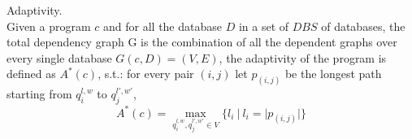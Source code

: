 \documentclass[a4paper,11pt]{article}
\begin{document}
%
%
\begin{defn}
Adaptivity.
\\
Given a program $c$ and for all the database $D$ in a set of $DBS$ of databases, the total dependency graph G is the combination of all the dependent graphs over every single database $G(c, D) = (V, E)$, the adaptivity of the program is defined as $A^*(c)$, s.t.:
for every pair $(i,j)$ let $p_{(i,j)}$ be the longest path starting from $q_i^{l, w}$ to $q_j^{l',w'}$,
%
$$A^*(c) = \max\limits_{q_i^{l,w},q_j^{l',w'} \in V }\{l_i ~|~ l_i = |p_(i,j)| \}$$
\end{defn}
\end{document}

